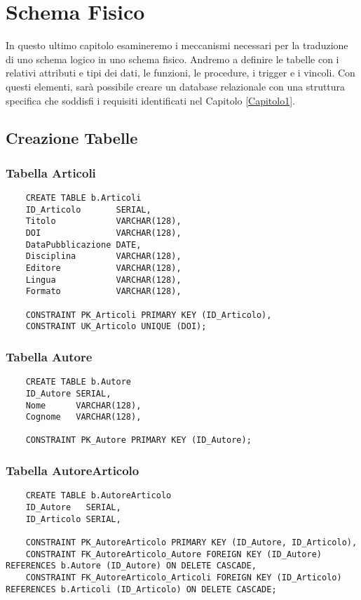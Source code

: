 \chapter{Schema Fisico}

In questo ultimo capitolo esamineremo i meccanismi necessari per la traduzione di uno schema logico 
in uno schema fisico. Andremo a definire le tabelle con i relativi attributi e tipi dei dati, le
funzioni, le procedure, i trigger e i vincoli. Con questi elementi, sar\`a possibile creare un database
relazionale con una struttura specifica che soddisfi i requisiti identificati nel Capitolo \ref{Capitolo1}.

\section{Creazione Tabelle}
\subsection{Tabella Articoli}
\begin{lstlisting}
    CREATE TABLE b.Articoli
    ID_Articolo       SERIAL,
    Titolo            VARCHAR(128),
    DOI               VARCHAR(128),
    DataPubblicazione DATE,
    Disciplina        VARCHAR(128),
    Editore           VARCHAR(128),
    Lingua            VARCHAR(128),
    Formato           VARCHAR(128),

    CONSTRAINT PK_Articoli PRIMARY KEY (ID_Articolo),
    CONSTRAINT UK_Articolo UNIQUE (DOI);
\end{lstlisting}
\subsection{Tabella Autore}
\begin{lstlisting}
    CREATE TABLE b.Autore
    ID_Autore SERIAL,
    Nome      VARCHAR(128),
    Cognome   VARCHAR(128),

    CONSTRAINT PK_Autore PRIMARY KEY (ID_Autore);
\end{lstlisting}
\subsection{Tabella AutoreArticolo}
\begin{lstlisting}
    CREATE TABLE b.AutoreArticolo
    ID_Autore   SERIAL,
    ID_Articolo SERIAL,

    CONSTRAINT PK_AutoreArticolo PRIMARY KEY (ID_Autore, ID_Articolo),
    CONSTRAINT FK_AutoreArticolo_Autore FOREIGN KEY (ID_Autore) REFERENCES b.Autore (ID_Autore) ON DELETE CASCADE,
    CONSTRAINT FK_AutoreArticolo_Articoli FOREIGN KEY (ID_Articolo) REFERENCES b.Articoli (ID_Articolo) ON DELETE CASCADE;
\end{lstlisting}

